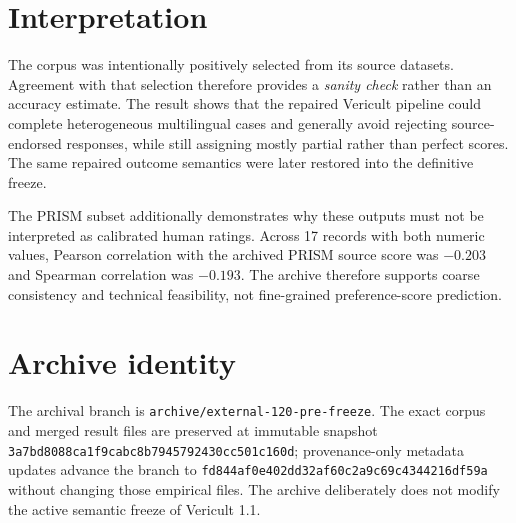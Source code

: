 \section*{Interpretation}

The corpus was intentionally positively selected from its source datasets. Agreement with that selection therefore provides a \emph{sanity check} rather than an accuracy estimate. The result shows that the repaired Vericult pipeline could complete heterogeneous multilingual cases and generally avoid rejecting source-endorsed responses, while still assigning mostly partial rather than perfect scores. The same repaired outcome semantics were later restored into the definitive freeze.

The PRISM subset additionally demonstrates why these outputs must not be interpreted as calibrated human ratings. Across 17 records with both numeric values, Pearson correlation with the archived PRISM source score was $-0.203$ and Spearman correlation was $-0.193$. The archive therefore supports coarse consistency and technical feasibility, not fine-grained preference-score prediction.

\section*{Archive identity}

The archival branch is \texttt{archive/external-120-pre-freeze}. The exact corpus and merged result files are preserved at immutable snapshot \texttt{3a7bd8088ca1f9cabc8b7945792430cc501c160d}; provenance-only metadata updates advance the branch to \texttt{fd844af0e402dd32af60c2a9c69c4344216df59a} without changing those empirical files. The archive deliberately does not modify the active semantic freeze of Vericult 1.1.
